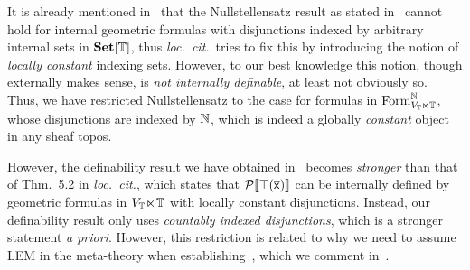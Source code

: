 \begin{remark}\label{rem:differentdefinability}
  It is already mentioned in~\citet[Rem.~3.8]{blechschmidt_general_2020} that the Nullstellensatz result as stated in~ cannot hold for internal geometric formulas with disjunctions indexed by arbitrary internal sets in $\mathbf{Set}[\mathbb{T}]$, thus \emph{loc.\ cit.}\ tries to fix this by introducing the notion of \emph{locally constant} indexing sets. However, to our best knowledge this notion, though externally makes sense, is \emph{not internally definable}, at least not obviously so. Thus, we have restricted Nullstellensatz to the case for formulas in $\mathrm{Form}^{\mathbb{N}}_{V_{\mathbb{T}}\ltimes\mathbb{T}}$, whose disjunctions are indexed by $\mathbb{N}$, which is indeed a globally \emph{constant} object in any sheaf topos.

  However, the definability result we have obtained in~ becomes \emph{stronger} than that of Thm.~5.2 in \emph{loc.\ cit.}, which states that $\mathcal{P}\llbracket\top(\overline{\mathsf{x}})\rrbracket$ can be internally defined by geometric formulas in $V_{\mathbb{T}}\hspace{-.4ex}\ltimes\hspace{-.4ex}\mathbb{T}$ with locally constant disjunctions. Instead, our definability result only uses \emph{countably indexed disjunctions}, which is a stronger statement \emph{a priori}. However, this restriction is related to why we need to assume \gls{LEM} in the meta-theory when establishing~, which we comment in~.
\end{remark}

